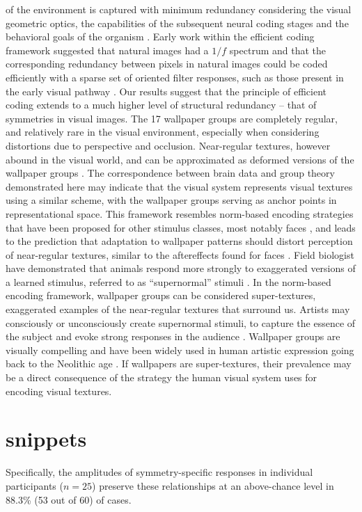 \documentclass[9pt,twocolumn,twoside,lineno]{pnas-new}
\begin{document}
of the environment is captured with minimum redundancy considering the visual geometric optics, the capabilities of the subsequent neural coding stages and the behavioral goals of the organism \cite{RN1758, RN1760, RN1757, RN1756}. Early work within the efficient coding framework suggested that natural images had a $1/f$ spectrum and that the corresponding redundancy between pixels in natural images could be coded efficiently with a sparse set of oriented filter responses, such as those present in the early visual pathway \cite{RN1740, RN1446}. Our results suggest that the principle of efficient coding extends to a much higher level of structural redundancy – that of symmetries in visual images. The 17 wallpaper groups are completely regular, and relatively rare in the visual environment, especially when considering distortions due to perspective and occlusion. Near-regular textures, however abound in the visual world, and can be approximated as deformed versions of the wallpaper groups \cite{RN1519}. The correspondence between brain data and group theory demonstrated here may indicate that the visual system represents visual textures using a similar scheme, with the wallpaper groups serving as anchor points in representational space. This framework resembles norm-based encoding strategies that have been proposed for other stimulus classes, most notably faces \cite{RN435}, and leads to the prediction that adaptation to wallpaper patterns should distort perception of near-regular textures, similar to the aftereffects found for faces \cite{RN1768}. Field biologist have demonstrated that animals respond more strongly to exaggerated versions of a learned stimulus, referred to as “supernormal” stimuli \cite{RN1775}. In the norm-based encoding framework, wallpaper groups can be considered super-textures, exaggerated examples of the near-regular textures that surround us. Artists may consciously or unconsciously create supernormal stimuli, to capture the essence of the subject and evoke strong responses in the audience \cite{RN1764}. Wallpaper groups are visually compelling and have been widely used in human artistic expression going back to the Neolithic age \cite{RN1949}. If wallpapers are super-textures, their prevalence may be a direct consequence of the strategy the human visual system uses for encoding visual textures. 

\section*{snippets}
Specifically, the amplitudes of symmetry-specific responses in individual participants ($n=25$) preserve these relationships at an above-chance level in 88.3\% (53 out of 60) of cases.
\end{document}

